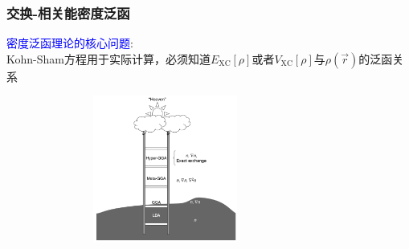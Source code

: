 {\frame                               %
{
\frametitle{交换-相关能密度泛函}
\textcolor{blue}{密度泛函理论的核心问题}:\\
\textrm{Kohn-Sham}方程用于实际计算，必须知道$E_{\mathrm{XC}}[\rho]$或者$V_{\mathrm{XC}}[\rho]$与$\rho(\vec r)$的泛函关系
\vskip 5pt
\begin{minipage}[b]{0.59\textwidth}
 \hspace*{-15pt}
 \begin{itemize}
	 \setlength{\itemsep}{15pt}
		 {\fontsize{7.5pt}{6.0pt}}
 \end{itemize}
\end{minipage}
\hfill
\begin{minipage}[b]{0.39\textwidth}
\begin{figure}[h!]
\hspace*{-10pt}
\includegraphics[height=1.9in,width=3.28in,viewport=10 5 1380 700,clip]{Figures/Jacobi-ladder.png}\\
\label{Jacobi-Ladder}
\end{figure}
\end{minipage}
}

}
